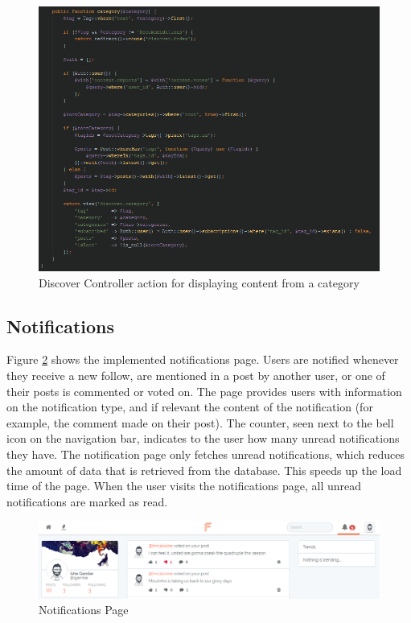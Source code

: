 \begin{figure}[H]
\centering
\includegraphics[width=\textwidth]{Images/Implementation/DiscoverControllerCategory}
\caption{Discover Controller action for displaying content from a category}
\label{fig:DiscoverControllerCategory}
\end{figure}

\subsection{Notifications}
Figure \ref{fig:NotificationsPage} shows the implemented notifications page. Users are notified whenever they receive a new follow, are mentioned in a post by another user, or one of their posts is commented or voted on. The page provides users with information on the notification type, and if relevant the content of the notification (for example, the comment made on their post). The counter, seen next to the bell icon on the navigation bar, indicates to the user how many unread notifications they have. The notification page only fetches unread notifications, which reduces the amount of data that is retrieved from the database. This speeds up the load time of the page. When the user visits the notifications page, all unread notifications are marked as read. 

\begin{figure}[H]
\centering
\includegraphics[width=\textwidth]{Images/Implementation/NotificationsPage}
\caption{Notifications Page}
\label{fig:NotificationsPage}
\end{figure}


